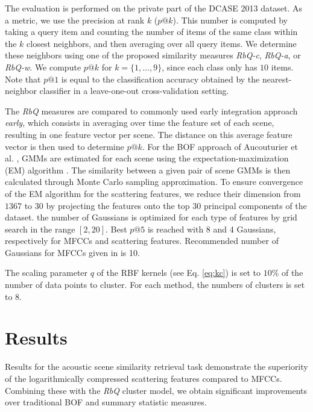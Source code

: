 \documentclass[smallextended]{svjour3}
\begin{document}
The evaluation is performed on the private part of the DCASE 2013 dataset. As a metric, we use the precision at rank $k$ ($p@k$). This number is computed by taking a query item and counting the number of items of the same class within the $k$ closest neighbors, and then averaging over all query items. We determine these neighbors using one of the proposed similarity measures \emph{RbQ-c}, \emph{RbQ-a}, or \emph{RbQ-w}. We compute $p@k$ for $k=\lbrace 1,\ldots,9\rbrace$, since each class only has $10$ items. Note that $p@1$ is equal to the classification accuracy obtained by the nearest-neighbor classifier in a leave-one-out cross-validation setting.

The \emph{RbQ} measures are compared to commonly used early integration approach \emph{early}, which consists in averaging over time the feature set of each scene, resulting in one feature vector per scene. The distance on this average feature vector is then used to determine $p@k$. For the BOF approach of Aucouturier et al. \cite{aucouturier2007bag}, GMMs are estimated for each scene using the expectation-maximization (EM) algorithm \cite{dempster-laird, moon1996expectation}. The similarity between a given pair of scene GMMs is then calculated through Monte Carlo sampling approximation. To ensure convergence of the EM algorithm for the scattering features, we reduce their dimension from $1367$ to $30$ by projecting the features onto the top $30$ principal components of the dataset. the number of Gaussians is optimized for each type of features by grid search in the range $[2, 20]$. Best $p@5$ is reached with 8 and 4  Gaussians, respectively for MFCCs and scattering features. Recommended number of Gaussians for MFCCs given in \cite{aucouturier2007bag} is 10.

The scaling parameter $q$ of the RBF kernels (see Eq. \ref{eq:kc}) is set to $10\%$ of the number of data points to cluster. For each method, the numbers of clusters is set to $8$.

\section{Results \label{sec:results}}

Results for the acoustic scene similarity retrieval task demonstrate the superiority of the logarithmically compressed scattering features compared to MFCCs.
Combining these with the \emph{RbQ} cluster model, we obtain significant improvements over traditional BOF and summary statistic measures.
\end{document}
